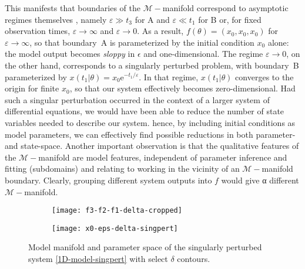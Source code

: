 This manifests that boundaries of the $\mathcal{M}-$manifold
correspond to asymptotic regimes themselves \cite{TQ}, namely
$\varepsilon \gg t_3$ for A and $\varepsilon \ll t_1$ for B or, for
fixed observation times, $\varepsilon \to \infty$ and
$\varepsilon \to 0$.  As a result,
$f(\theta) = (x_0,x_0,x_0)$ for $\varepsilon \to \infty$,
so that boundary~A is parameterized by the initial condition $x_0$
alone: the model output becomes \emph{sloppy} in $\epsilon$ and
one-dimensional.  The regime $\varepsilon \to 0$, on the other hand,
corresponds to a singularly perturbed problem, with boundary~B
parameterized by
$x(t_1 \vert \theta) = x_0\mathrm{e}^{-t_1/\varepsilon}$.  In that
regime, $x(t_1 \vert \theta)$ converges to the origin for finite
$x_0$, so that our system effectively becomes zero-dimensional.  Had
such a singular perturbation occurred in the context of a larger
system of differential equations, we would have been able to reduce
the number of state variables needed to describe our system.  hence,
by including initial conditions as model parameters, we can
effectively find possible reductions in both parameter- and
state-space.  Another important observation is that the qualitative
features of the $\mathcal{M}-$manifold are model features, independent
of parameter inference and fitting (subdomains) and relating to
working in the vicinity of an $\mathcal{M}-$manifold boundary.
Clearly, grouping different system outputs into $f$ would
give α different $\mathcal{M}-$manifold.

\begin{figure*}
  \centering
  \begin{subfigure}[t]{0.45\linewidth}
    \centering
    \texttt{[image: f3-f2-f1-delta-cropped]}
  \end{subfigure}
  \hspace{0.5cm}
  \begin{subfigure}[t]{0.45\linewidth}
    \centering
    \texttt{[image: x0-eps-delta-singpert]}
  \end{subfigure}
  \caption[Model manifold and parameter space of the singularly
    perturbed system]{Model manifold and parameter space of the singularly
    perturbed system \eqref{1D-model-singpert} with select $\delta$
    contours.
    \label{fig:sing-pert} }
\end{figure*}
% 

